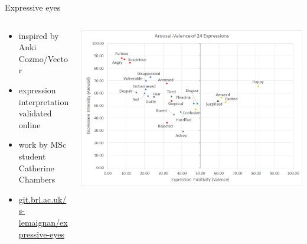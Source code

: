 \documentclass[xcolor=table]{beamer}
\begin{document}
\begin{frame}{Expressive eyes}
    \begin{columns}
        \begin{column}{0.5\linewidth}
            {
                \scriptsize
            \begin{itemize}
                \item inspired by Anki Cozmo/Vector
                \item expression interpretation validated online
                \item work by MSc student Catherine Chambers
                \item
                    \href{https://git.brl.ac.uk/s-lemaignan/expressive-eyes}{git.brl.ac.uk/s-lemaignan/expressive-eyes}
            \end{itemize}
        }
        \end{column}
        \begin{column}{0.5\linewidth}
        \begin{center}
            \includegraphics[width=\linewidth]{figs/expressive-eyes/online-study.png}
        \end{center}
        \end{column}
    \end{columns}
\end{frame}


%
%
\end{document}
